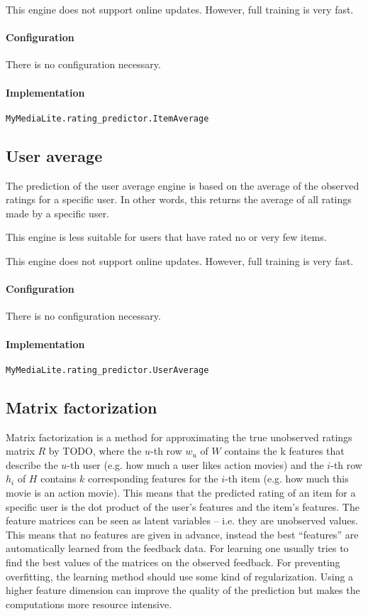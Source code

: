 \documentclass[]{report}
\begin{document}
This engine does not support online updates. However, full training is
very fast.

\paragraph{Configuration}
There is no configuration necessary.

\paragraph{Implementation}
\texttt{MyMediaLite.rating\_predictor.ItemAverage}

\subsection{User average}
The prediction of the user average engine is based on the average of
the observed ratings for a specific user. In other words, this returns
the average of all ratings made by a specific user.

This engine is less suitable for users that have rated no or very few
items.

This engine does not support online updates. However, full training is
very fast.

\paragraph{Configuration}
There is no configuration necessary.

\paragraph{Implementation}
\texttt{MyMediaLite.rating\_predictor.UserAverage}

\subsection{Matrix factorization}
Matrix factorization is a method for approximating the true unobserved
ratings matrix $R$ by TODO, where the $u$-th row $w_{u}$ of $W$
contains the k features that describe the $u$-th user
(e.g. how much a user likes action movies) and the
$i$-{th} row $h_{i}$ of $H$ contains $k$
corresponding features for the $i$-{th} item (e.g. how
much this movie is an action movie). This means that the predicted
rating of an item for a specific user is the dot product of the
user's features and the item's
features. The feature matrices can be seen as latent variables – i.e.
they are unobserved values. This means that no features are given in
advance, instead the best “features” are automatically learned from the
feedback data. For learning one usually tries to find the best values
of the matrices on the observed feedback. For preventing overfitting,
the learning method should use some kind of regularization. Using a
higher feature dimension can improve the quality of the prediction but
makes the computations more resource intensive. 
\end{document}
